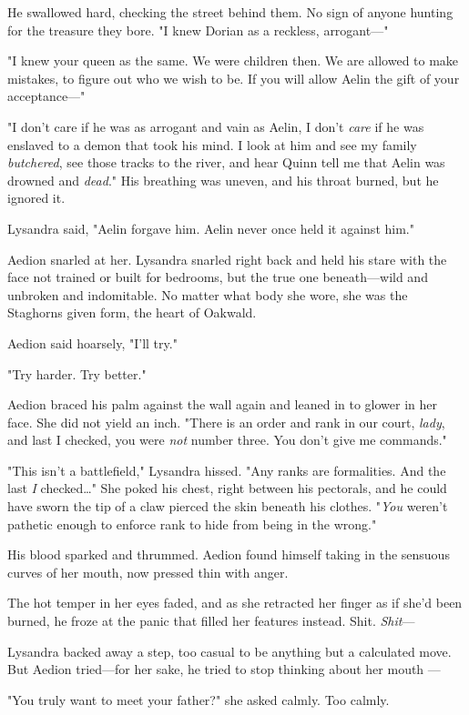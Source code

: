 He swallowed hard, checking the street behind them.
No sign of anyone hunting for the treasure they bore.
"I knew Dorian as a reckless, arrogant---"

"I knew your queen as the same.
We were children then.
We are allowed to make mistakes, to figure out who we wish to be.
If you will allow Aelin the gift of your acceptance---"

"I don't care if he was as arrogant and vain as Aelin, I don't \emph{care} if he was enslaved to a demon that took his mind.
I look at him and see my family \emph{butchered}, see those tracks to the river, and hear Quinn tell me that Aelin was drowned and \emph{dead}."
His breathing was uneven, and his throat burned, but he ignored it.

Lysandra said, "Aelin forgave him.
Aelin never once held it against him."

Aedion snarled at her.
Lysandra snarled right back and held his stare with the face not trained or built for bedrooms, but the true one beneath---wild and unbroken and indomitable.
No matter what body she wore, she was the Staghorns given form, the heart of Oakwald.

Aedion said hoarsely, "I'll try."

"Try harder.
Try better."

Aedion braced his palm against the wall again and leaned in to glower in her face.
She did not yield an inch.
"There is an order and rank in our court, \emph{lady}, and last I checked, you were \emph{not} number three.
You don't give me commands."

"This isn't a battlefield," Lysandra hissed.
"Any ranks are formalities.
And the last \emph{I} checked\ldots" She poked his chest, right between his pectorals, and he could have sworn the tip of a claw pierced the skin beneath his clothes.
"\emph{You} weren't pathetic enough to enforce rank to hide from being in the wrong."

His blood sparked and thrummed.
Aedion found himself taking in the sensuous curves of her mouth, now pressed thin with anger.

The hot temper in her eyes faded, and as she retracted her finger as if she'd been burned, he froze at the panic that filled her features instead.
Shit.
\emph{Shit}---

Lysandra backed away a step, too casual to be anything but a calculated move.
But Aedion tried---for her sake, he tried to stop thinking about her mouth ---

"You truly want to meet your father?"
she asked calmly.
Too calmly.

